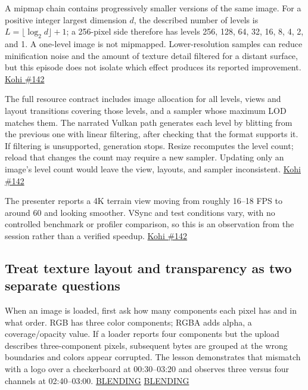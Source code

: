\hypertarget{06-engine-ii-ch027-allocate-every-mip-level-and-keep-the-sampler-synchronized-with-it}{}

A mipmap chain contains progressively smaller versions of the same image. For a positive integer largest dimension \(d\), the described number of levels is \(L=\lfloor\log_2 d\rfloor+1\); a 256-pixel side therefore has levels 256, 128, 64, 32, 16, 8, 4, 2, and 1. A one-level image is not mipmapped. Lower-resolution samples can reduce minification noise and the amount of texture detail filtered for a distant surface, but this episode does not isolate which effect produces its reported improvement. \href{https://www.youtube.com/watch?v=xb23Y9o7tP4}{Kohi \#142}

The full resource contract includes image allocation for all levels, views and layout transitions covering those levels, and a sampler whose maximum LOD matches them. The narrated Vulkan path generates each level by blitting from the previous one with linear filtering, after checking that the format supports it. If filtering is unsupported, generation stops. Resize recomputes the level count; reload that changes the count may require a new sampler. Updating only an image's level count would leave the view, layouts, and sampler inconsistent. \href{https://www.youtube.com/watch?v=xb23Y9o7tP4}{Kohi \#142}

The presenter reports a 4K terrain view moving from roughly 16--18 FPS to around 60 and looking smoother. VSync and test conditions vary, with no controlled benchmark or profiler comparison, so this is an observation from the session rather than a verified speedup. \href{https://www.youtube.com/watch?v=xb23Y9o7tP4}{Kohi \#142}

\subsection{Treat texture layout and transparency as two separate questions}\label{06-engine-ii-ch027-treat-texture-layout-and-transparency-as-two-separate-questions}

\hypertarget{06-engine-ii-ch027-treat-texture-layout-and-transparency-as-two-separate-questions}{}

When an image is loaded, first ask how many components each pixel has and in what order. RGB has three color components; RGBA adds alpha, a coverage/opacity value. If a loader reports four components but the upload describes three-component pixels, subsequent bytes are grouped at the wrong boundaries and colors appear corrupted. The lesson demonstrates that mismatch with a logo over a checkerboard at 00:30--03:20 and observes three versus four channels at 02:40--03:00. \href{https://www.youtube.com/watch?v=N94fHNZEHas&t=30s}{BLENDING} \href{https://www.youtube.com/watch?v=N94fHNZEHas&t=160s}{BLENDING}

